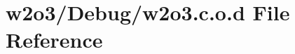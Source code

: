 \hypertarget{w2o3_8c_8o_8d}{}\section{w2o3/\+Debug/w2o3.c.\+o.\+d File Reference}
\label{w2o3_8c_8o_8d}
